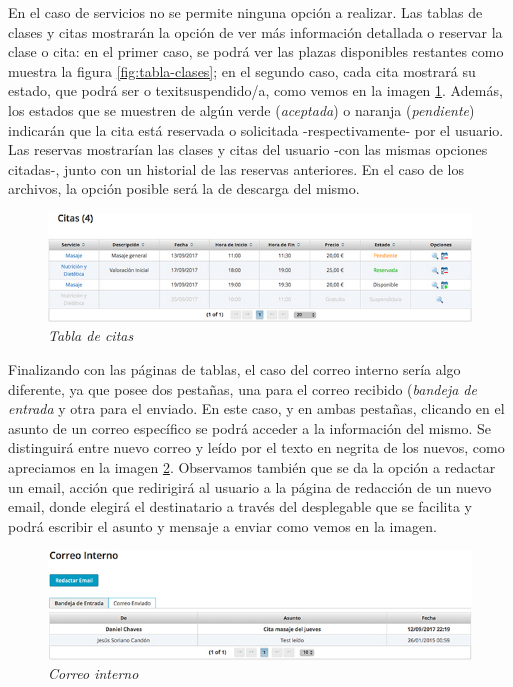 En el caso de servicios no se permite ninguna opción a realizar. Las tablas de clases y citas mostrarán la opción de ver más información detallada o reservar la clase o cita: en el primer caso, se podrá ver las plazas disponibles restantes como muestra la figura \ref{fig:tabla-clases}; en el segundo caso, cada cita mostrará su estado, que podrá ser  o texit{suspendido/a}, como vemos en la imagen \ref{fig:tabla-citas}. Además, los estados que se muestren de algún verde (\textit{aceptada}) o naranja (\textit{pendiente}) indicarán que la cita está reservada o solicitada -respectivamente- por el usuario. Las reservas mostrarían las clases y citas del usuario -con las mismas opciones citadas-, junto con un historial de las reservas anteriores. En el caso de los archivos, la opción posible será la de descarga del mismo. 

\begin{figure}
\centering
  \includegraphics[scale=.70]{img/manual/tabla-citas.jpg}
  \caption{\textit{Tabla de citas}}
  \label{fig:tabla-citas}
\end{figure}

Finalizando con las páginas de tablas, el caso del correo interno sería algo diferente, ya que posee dos pestañas, una para el correo recibido (\textit{bandeja de entrada} y otra para el enviado. En este caso, y en ambas pestañas, clicando en el asunto de un correo específico se podrá acceder a la información del mismo. Se distinguirá entre nuevo correo y leído por el texto en negrita de los nuevos, como apreciamos en la imagen \ref{fig:correo-interno}. Observamos también que se da la opción a redactar un email, acción que redirigirá al usuario a la página de redacción de un nuevo email, donde elegirá el destinatario a través del desplegable que se facilita y podrá escribir el asunto y mensaje a enviar como vemos en la imagen. 

\begin{figure}
\centering
  \includegraphics[scale=.70]{img/manual/correo-interno.jpg}
  \caption{\textit{Correo interno}}
  \label{fig:correo-interno}
\end{figure}

